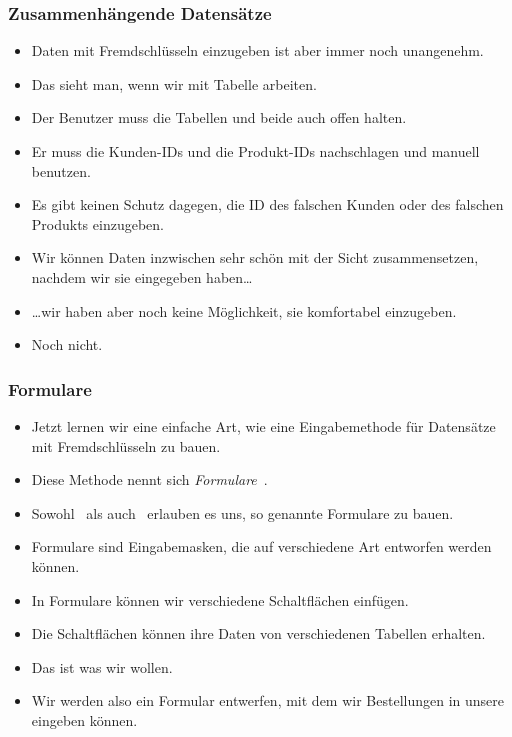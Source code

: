 \documentclass[aspectratio=169,mathserif,notheorems]{beamer}%
\begin{document}
\begin{frame}%
\frametitle{Zusammenhängende Datensätze}%
\begin{itemize}%
\item Daten mit Fremdschlüsseln einzugeben ist aber immer noch unangenehm.%
%
\item<2-> Das sieht man, wenn wir mit Tabelle  arbeiten.%
%
\item<3-> Der Benutzer muss die Tabellen  und  beide auch offen halten.%
%
\item<4-> Er muss die Kunden-IDs und die Produkt-IDs nachschlagen und manuell benutzen.%
%
\item<5-> Es gibt keinen Schutz dagegen, die ID des falschen Kunden oder des falschen Produkts einzugeben.%
%
\item<6-> Wir können Daten inzwischen sehr schön mit der Sicht  zusammensetzen, nachdem wir sie eingegeben haben{\dots}%
%
\item<7-> {\dots}wir haben aber noch keine Möglichkeit, sie komfortabel einzugeben.%
%
\item<8-> Noch nicht.%
%
\end{itemize}%
\end{frame}%
%
\begin{frame}%
\frametitle{Formulare}%
%
\begin{itemize}%
%
\item Jetzt lernen wir eine einfache Art, wie eine Eingabemethode für Datensätze mit Fremdschlüsseln zu bauen.%
%
\item<2-> Diese Methode nennt sich \emph{Formulare}~.%
%
\item<3-> Sowohl \microsoftAccess\ als auch \libreofficeBase\ erlauben es uns, so genannte Formulare zu bauen.%
%
\item<4-> Formulare sind Eingabemasken, die auf verschiedene Art entworfen werden können.%
%
\item<5-> In Formulare können wir verschiedene Schaltflächen einfügen.%
%
\item<6-> Die Schaltflächen können ihre Daten von verschiedenen Tabellen erhalten.%
%
\item<7-> Das ist was wir wollen.%
%
\item<8-> Wir werden also ein Formular entwerfen, mit dem wir Bestellungen in unsere  eingeben können.%
\end{itemize}%
\end{frame}%
%
\end{document}
